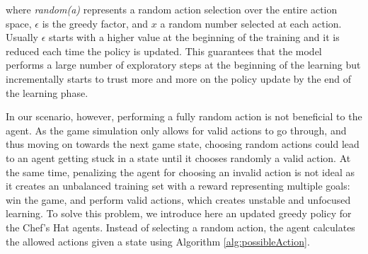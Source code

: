 \documentclass[a4paper,conference]{IEEEtran}
\begin{document}
\noident where \emph{random(a)} represents a random action selection over the entire action space,  $\epsilon$ is the greedy factor, and $x$ a random number selected at each action. Usually $\epsilon$ starts with a higher value at the beginning of the training and it is reduced each time the policy is updated. This guarantees that the model performs a large number of exploratory steps at the beginning of the learning but incrementally starts to trust more and more on the policy update by the end of the learning phase.

In our scenario, however, performing a fully random action is not beneficial to the agent. As the game simulation only allows for valid actions to go through, and thus moving on towards the next game state, choosing random actions could lead to an agent getting stuck in a state until it chooses randomly a valid action. At the same time, penalizing the agent for choosing an invalid action is not ideal as it creates an unbalanced training set with a reward representing multiple goals: win the game, and perform valid actions, which creates unstable and unfocused learning. To solve this problem, we introduce here an updated greedy policy for the Chef's Hat agents. Instead of selecting a random action, the agent calculates the allowed actions given a state using Algorithm \ref{alg:possibleAction}.
\end{document}
